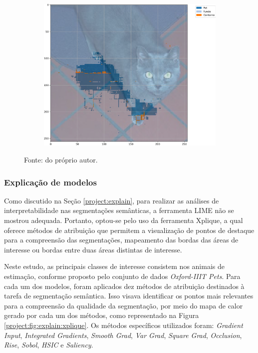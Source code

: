 \begin{figure}[H]
\begin{subfigure}[t]{0.32\textwidth}
         \label{results:fig:semantic:14.2}
     \end{subfigure}%
     ~ 
    \begin{subfigure}[t]{0.32\textwidth}
         \centering
         \includegraphics[width=1\linewidth]{recursos/imagens/results/bpca_miou_unetlie500_image_2_overlayed_segmentation.png}
         \label{results:fig:semantic:14.3}
     \end{subfigure}%

    Fonte: do próprio autor.
\end{figure}



\subsubsection{Explicação de modelos}
\label{results:semantic:xai}
Como discutido na Seção \ref{project:explain}, para realizar as análises de interpretabilidade nas segmentações semânticas, a ferramenta LIME não se mostrou adequada. Portanto, optou-se pelo uso da ferramenta Xplique, a qual oferece métodos de atribuição que permitem a visualização de pontos de destaque para a compreensão das segmentações, mapeamento das bordas das áreas de interesse ou bordas entre duas áreas distintas de interesse.

Neste estudo, as principais classes de interesse consistem nos animais de estimação, conforme proposto pelo conjunto de dados \textit{Oxford-IIIT Pets}. Para cada um dos modelos, foram aplicados dez métodos de atribuição destinados à tarefa de segmentação semântica. Isso visava identificar os pontos mais relevantes para a compreensão da qualidade da segmentação, por meio do mapa de calor gerado por cada um dos métodos, como representado na Figura \ref{project:fig:explain:xplique}. Os métodos específicos utilizados foram: \textit{Gradient Input}, \textit{Integrated Gradients}, \textit{Smooth Grad}, \textit{Var Grad}, \textit{Square Grad}, \textit{Occlusion}, \textit{Rise}, \textit{Sobol}, \textit{HSIC} e \textit{Saliency}.

